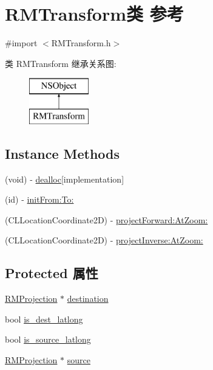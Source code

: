 \hypertarget{interface_r_m_transform}{\section{R\-M\-Transform类 参考}
\label{interface_r_m_transform}
}


{\ttfamily \#import $<$R\-M\-Transform.\-h$>$}

类 R\-M\-Transform 继承关系图\-:\begin{figure}[H]
\begin{center}
\leavevmode
\includegraphics[height=2.000000cm]{interface_r_m_transform}
\end{center}
\end{figure}
\subsection*{Instance Methods}
\begin{DoxyCompactItemize}
\item 
(void) -\/ \hyperlink{interface_r_m_transform_ab263ad10f849e5ae72d73c40343554fe}{dealloc}{\ttfamily  \mbox{[}implementation\mbox{]}}
\item 
(id) -\/ \hyperlink{interface_r_m_transform_ad2fe8d16cb70f3b165f48fcd2c05aa7b}{init\-From\-:\-To\-:}
\item 
(C\-L\-Location\-Coordinate2\-D) -\/ \hyperlink{interface_r_m_transform_affd680a05b3f9c144163dee481bf89a1}{project\-Forward\-:\-At\-Zoom\-:}
\item 
(C\-L\-Location\-Coordinate2\-D) -\/ \hyperlink{interface_r_m_transform_ac75d144ba71bea2d6a69b2e4168250f9}{project\-Inverse\-:\-At\-Zoom\-:}
\end{DoxyCompactItemize}
\subsection*{Protected 属性}
\begin{DoxyCompactItemize}
\item 
\hyperlink{interface_r_m_projection}{R\-M\-Projection} $\ast$ \hyperlink{interface_r_m_transform_abcdf67a972e7ec14094c8bf7fe7b1a5b}{destination}
\item 
bool \hyperlink{interface_r_m_transform_a75233a22ecce75a6c1ba6b754a32c87c}{is\-\_\-dest\-\_\-latlong}
\item 
bool \hyperlink{interface_r_m_transform_aedd620e0e19c3b4a7d626ab5b45539a7}{is\-\_\-source\-\_\-latlong}
\item 
\hyperlink{interface_r_m_projection}{R\-M\-Projection} $\ast$ \hyperlink{interface_r_m_transform_a9064c8c9ce663542284bbc1012590f80}{source}
\end{DoxyCompactItemize}



